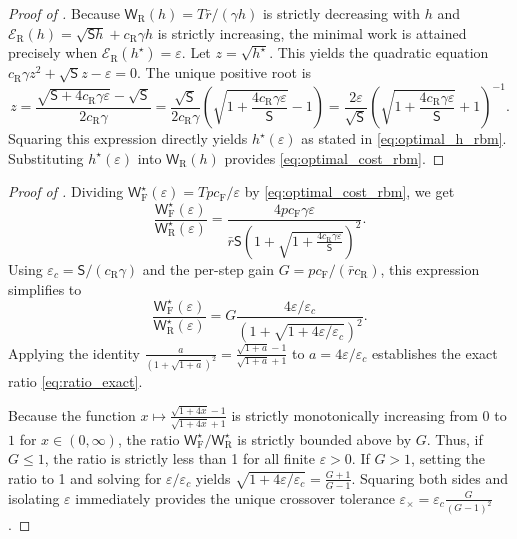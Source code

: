 \documentclass[twoside,11pt]{article}
\theoremstyle{plain}
\begin{document}
\begin{proof}[Proof of ]
Because $\mathsf W_{\mathrm{R}}(h) = T\bar r/(\gamma h)$ is strictly decreasing with $h$ and $\mathcal{E}_{\mathrm{R}}(h) = \sqrt{\mathsf{S}h} + c_{\mathrm{R}}\gamma h$ is strictly increasing, the minimal work is attained precisely when $\mathcal{E}_{\mathrm{R}}(h^\star) = \varepsilon$. Let $z = \sqrt{h^\star}$. This yields the quadratic equation $c_{\mathrm{R}}\gamma z^2 + \sqrt{\mathsf{S}}z - \varepsilon = 0$. The unique positive root is
\begin{equation*}
z = \frac{\sqrt{\mathsf{S}+4c_{\mathrm{R}}\gamma\varepsilon}-\sqrt{\mathsf{S}}}{2c_{\mathrm{R}}\gamma} = \frac{\sqrt{\mathsf{S}}}{2c_{\mathrm{R}}\gamma}\left(\sqrt{1+\frac{4c_{\mathrm{R}}\gamma\varepsilon}{\mathsf{S}}}-1\right)=\frac{2\varepsilon}{\sqrt{\mathsf{S}}}\left(\sqrt{1+\frac{4c_{\mathrm{R}}\gamma\varepsilon}{\mathsf{S}}}+1\right)^{-1}.
\end{equation*}
Squaring this expression directly yields $h^\star(\varepsilon)$ as stated in \eqref{eq:optimal_h_rbm}. Substituting $h^\star(\varepsilon)$ into $\mathsf W_{\mathrm{R}}(h)$ provides \eqref{eq:optimal_cost_rbm}.
\end{proof}

\begin{proof}[Proof of ]
Dividing $\mathsf W_{\mathrm{F}}^\star(\varepsilon) = Tpc_{\mathrm{F}}/\varepsilon$ by \eqref{eq:optimal_cost_rbm}, we get
\begin{equation*}
\frac{\mathsf W_{\mathrm{F}}^\star(\varepsilon)}{\mathsf W_{\mathrm{R}}^\star(\varepsilon)} = \frac{4p c_{\mathrm{F}} \gamma \varepsilon}{\bar r \mathsf{S} \left(1+\sqrt{1+\frac{4c_{\mathrm{R}}\gamma\varepsilon}{\mathsf{S}}}\right)^2}.
\end{equation*}
Using $\varepsilon_c = \mathsf{S}/(c_{\mathrm{R}}\gamma)$ and the per-step gain $G = p c_{\mathrm{F}}/(\bar r c_{\mathrm{R}})$, this expression simplifies to
\begin{equation*}
\frac{\mathsf W_{\mathrm{F}}^\star(\varepsilon)}{\mathsf W_{\mathrm{R}}^\star(\varepsilon)} = G \frac{4\varepsilon/\varepsilon_c}{\left(1+\sqrt{1+4\varepsilon/\varepsilon_c}\right)^2}.
\end{equation*}
Applying the identity $\frac{a}{(1+\sqrt{1+a})^2} = \frac{\sqrt{1+a}-1}{\sqrt{1+a}+1}$ to $a = 4\varepsilon/\varepsilon_c$ establishes the exact ratio \eqref{eq:ratio_exact}.

Because the function $x \mapsto \frac{\sqrt{1+4x}-1}{\sqrt{1+4x}+1}$ is strictly monotonically increasing from $0$ to $1$ for $x \in (0,\infty)$, the ratio $\mathsf W_{\mathrm{F}}^\star/\mathsf W_{\mathrm{R}}^\star$ is strictly bounded above by $G$. Thus, if $G \le 1$, the ratio is strictly less than 1 for all finite $\varepsilon>0$. If $G > 1$, setting the ratio to 1 and solving for $\varepsilon/\varepsilon_c$ yields $\sqrt{1+4\varepsilon/\varepsilon_c} = \frac{G+1}{G-1}$. Squaring both sides and isolating $\varepsilon$ immediately provides the unique crossover tolerance $\varepsilon_\times = \varepsilon_c \frac{G}{(G-1)^2}$.
\end{proof}
\end{document}
